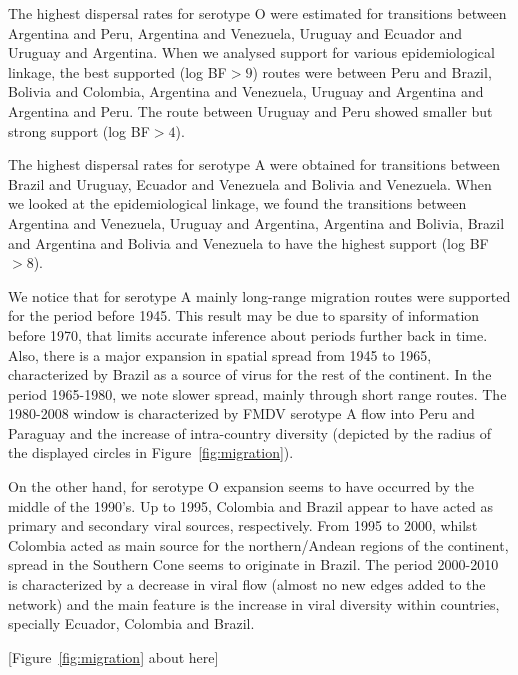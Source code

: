 \documentclass[10pt]{article}
\begin{document}
The highest dispersal rates for serotype O were estimated for transitions between Argentina and Peru, Argentina and Venezuela, Uruguay and Ecuador and Uruguay and Argentina.
When we analysed support for various epidemiological linkage,
the best supported (log BF$>9$) routes were between Peru and Brazil, Bolivia and Colombia, Argentina and Venezuela, Uruguay and Argentina and Argentina and Peru. The route between Uruguay and Peru showed smaller but strong support (log BF$>4$).

The highest dispersal rates for serotype A were obtained for transitions between Brazil and Uruguay, Ecuador and Venezuela and Bolivia and Venezuela.
When we looked at the epidemiological linkage, we found the transitions between Argentina and Venezuela, Uruguay and Argentina, Argentina and Bolivia, Brazil and Argentina and Bolivia and Venezuela to have the highest support (log BF$>8$).

We notice that for serotype A mainly long-range migration routes were supported for the period before 1945.
This result may be due to sparsity of information before 1970, that limits accurate inference about periods further back in time. 
Also, there is a major expansion in spatial spread from 1945 to 1965, characterized by Brazil as a source of virus for the rest of the continent.
In the period 1965-1980, we note slower spread, mainly through short range routes.
The 1980-2008 window is characterized by FMDV serotype A flow into Peru and Paraguay and the increase of intra-country diversity (depicted by the radius of the displayed circles in Figure~\ref{fig:migration}).   

On the other hand, for serotype O expansion seems to have occurred by the middle of the 1990's.
Up to 1995, Colombia and Brazil appear to have acted as primary and secondary viral sources, respectively.
From 1995 to 2000, whilst Colombia acted as main source for the northern/Andean regions of the continent, spread in the Southern Cone seems to originate in Brazil.
The period 2000-2010 is characterized by a decrease in viral flow (almost no new edges added to the network) and the main feature is the increase in viral diversity within countries, specially Ecuador, Colombia and Brazil.

\begin{center}
 [Figure~\ref{fig:migration} about here]
\end{center}
\end{document}
